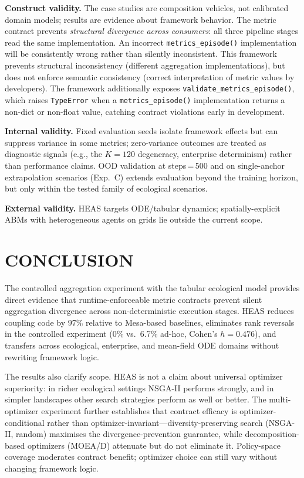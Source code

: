 \documentclass{wscpaperproc}
\begin{document}
\textbf{Construct validity.} The case studies are composition vehicles, not
calibrated domain models; results are evidence about framework behavior. The
metric contract prevents \emph{structural divergence across consumers}: all
three pipeline stages read the same implementation. An incorrect \texttt{metrics\_episode()}
implementation will be consistently wrong rather than silently inconsistent. This framework prevents structural inconsistency (different aggregation implementations), but does not enforce semantic consistency (correct interpretation of metric values by developers). The
framework additionally exposes \texttt{validate\_metrics\_episode()}, which raises
\texttt{TypeError} when a \texttt{metrics\_episode()} implementation returns a
non-dict or non-float value, catching contract violations early in development.

\textbf{Internal validity.} Fixed evaluation seeds isolate framework effects
but can suppress variance in some metrics; zero-variance outcomes are treated as
diagnostic signals (e.g., the $K\!=\!120$ degeneracy, enterprise determinism)
rather than performance claims. OOD validation at steps\,=\,500 and on
single-anchor extrapolation scenarios (Exp.~C) extends evaluation beyond the
training horizon, but only within the tested family of ecological scenarios.

\textbf{External validity.} HEAS targets ODE/tabular dynamics; spatially-explicit ABMs
with heterogeneous agents on grids lie outside the current scope.

\section{CONCLUSION}

The controlled aggregation experiment with the tabular ecological model provides
direct evidence that runtime-enforceable metric contracts prevent silent
aggregation divergence across non-deterministic execution stages. HEAS reduces
coupling code by 97\% relative to Mesa-based baselines, eliminates rank reversals
in the controlled experiment (0\% vs.\ 6.7\% ad-hoc, Cohen's $h = 0.476$), and
transfers across ecological, enterprise, and mean-field ODE domains without
rewriting framework logic.

The results also clarify scope. HEAS is not a claim about universal optimizer
superiority: in richer ecological settings NSGA-II performs strongly, and in
simpler landscapes other search strategies perform as well or better. The
multi-optimizer experiment further establishes that contract efficacy is
optimizer-conditional rather than optimizer-invariant---diversity-preserving
search (NSGA-II, random) maximises the divergence-prevention guarantee, while
decomposition-based optimizers (MOEA/D) attenuate but do not eliminate it.
Policy-space coverage moderates contract benefit; optimizer choice can still
vary without changing framework logic.
\end{document}
